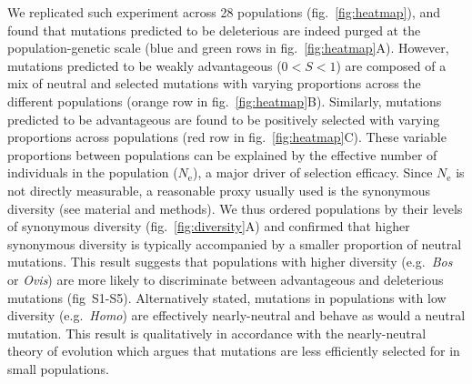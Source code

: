 \documentclass{article}
\newcommand{\Ne}{N_{\textrm{e}}}
\newcommand{\Sphy}{S}
\newcommand{\divWeakAdv}{0 < \Sphy < 1}
\begin{document}
    We replicated such experiment across 28 populations (fig.~\ref{fig:heatmap}), and found that mutations predicted to be deleterious are indeed purged at the population-genetic scale (blue and green rows in fig.~\ref{fig:heatmap}A).
    However, mutations predicted to be weakly advantageous ($\divWeakAdv$) are composed of a mix of neutral and selected mutations with varying proportions across the different populations (orange row in fig.~\ref{fig:heatmap}B).
    Similarly, mutations predicted to be advantageous are found to be positively selected with varying proportions across populations (red row in fig.~\ref{fig:heatmap}C).
    These variable proportions between populations can be explained by the effective number of individuals in the population ($\Ne$), a major driver of selection efficacy.
    Since $\Ne$ is not directly measurable, a reasonable proxy usually used is the synonymous diversity (see material and methods).
    We thus ordered populations by their levels of synonymous diversity (fig.~\ref{fig:diversity}A) and confirmed that higher synonymous diversity is typically accompanied by a smaller proportion of neutral mutations.
    This result suggests that populations with higher diversity (e.g.~\textit{Bos} or \textit{Ovis}) are more likely to discriminate between advantageous and deleterious mutations (fig~S1-S5).
    Alternatively stated, mutations in populations with low diversity (e.g.~\textit{Homo}) are effectively nearly-neutral and behave as would a neutral mutation.
    This result is qualitatively in accordance with the nearly-neutral theory of evolution which argues that mutations are less efficiently selected for in small populations.
\end{document}
